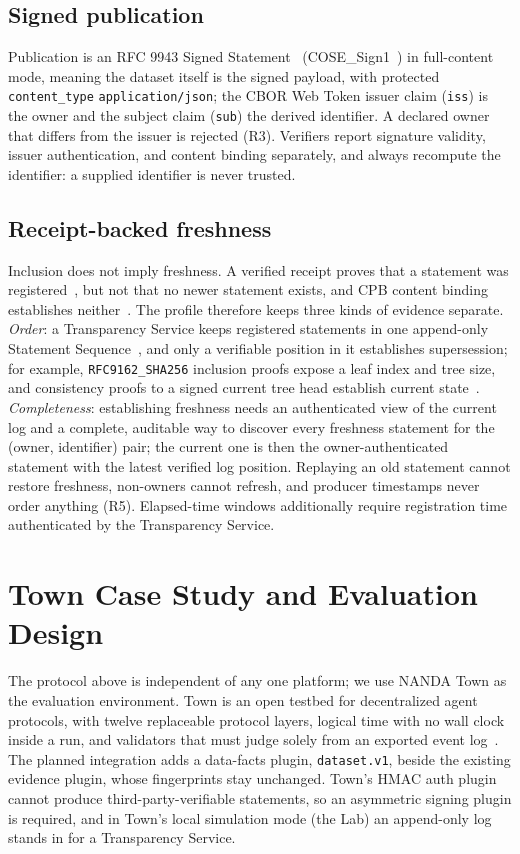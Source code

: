 \documentclass[conference]{IEEEtran}
\begin{document}
\subsection{Signed publication}
Publication is an RFC 9943 Signed Statement~\cite{rfc9943} (COSE\_Sign1~\cite{rfc9052}) in full-content mode, meaning the dataset itself is the signed payload, with protected \texttt{content\_type} \texttt{application/json}; the CBOR Web Token issuer claim (\texttt{iss}) is the owner and the subject claim (\texttt{sub}) the derived identifier. A declared owner that differs from the issuer is rejected (R3). Verifiers report signature validity, issuer authentication, and content binding separately, and always recompute the identifier: a supplied identifier is never trusted.

\subsection{Receipt-backed freshness}\label{sec:fresh}
Inclusion does not imply freshness. A verified receipt proves that a statement was registered~\cite{rfc9942}, but not that no newer statement exists, and CPB content binding establishes neither~\cite{cpb03}. The profile therefore keeps three kinds of evidence separate. \emph{Order}: a Transparency Service keeps registered statements in one append-only Statement Sequence~\cite{rfc9943}, and only a verifiable position in it establishes supersession; for example, \texttt{RFC9162\_SHA256} inclusion proofs expose a leaf index and tree size, and consistency proofs to a signed current tree head establish current state~\cite{rfc9162}. \emph{Completeness}: establishing freshness needs an authenticated view of the current log and a complete, auditable way to discover every freshness statement for the (owner, identifier) pair; the current one is then the owner-authenticated statement with the latest verified log position. Replaying an old statement cannot restore freshness, non-owners cannot refresh, and producer timestamps never order anything (R5). Elapsed-time windows additionally require registration time authenticated by the Transparency Service.

\section{Town Case Study and Evaluation Design}

The protocol above is independent of any one platform; we use NANDA Town as the evaluation environment. Town is an open testbed for decentralized agent protocols, with twelve replaceable protocol layers, logical time with no wall clock inside a run, and validators that must judge solely from an exported event log~\cite{town}. The planned integration adds a data-facts plugin, \texttt{dataset.v1}, beside the existing evidence plugin, whose fingerprints stay unchanged. Town's HMAC auth plugin cannot produce third-party-verifiable statements, so an asymmetric signing plugin is required, and in Town's local simulation mode (the Lab) an append-only log stands in for a Transparency Service.
\end{document}
